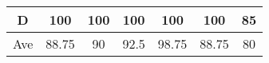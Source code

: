 \documentclass{article}
\begin{document}
\begin{table}[H]
\begin{tabular}{|c|c|c|c|c|c|c|}
      		D   & 100                                                          & 100                                                          & 100                                                          & 100                                                        & 100                                                   & 85     \\ \hline
      		Ave & 88.75                                                        & 90                                                           & 92.5                                                         & 98.75                                                      & 88.75                                                 & 80     \\ \hline
      	\end{tabular}
      \end{table}
  
\end{document}
